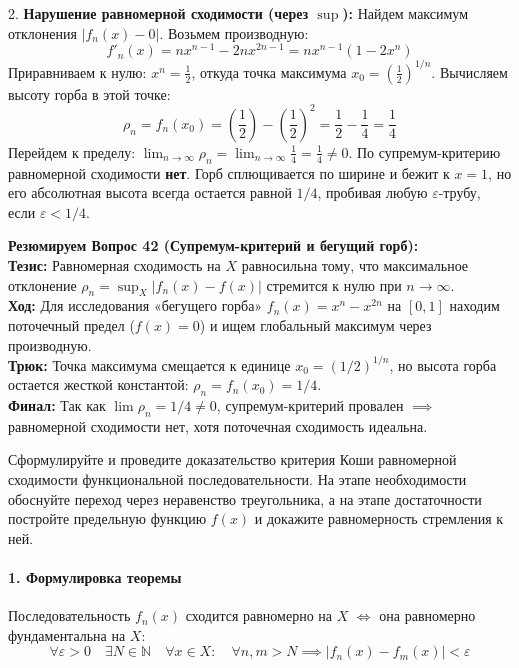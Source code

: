 2. \textbf{Нарушение равномерной сходимости (через $\sup$):}
Найдем максимум отклонения $|f_n(x) - 0|$. Возьмем производную:
$$ f'_n(x) = n x^{n-1} - 2n x^{2n-1} = n x^{n-1} (1 - 2x^n) $$
Приравниваем к нулю: $x^n = \frac{1}{2}$, откуда точка максимума $x_0 = \left(\frac{1}{2}\right)^{1/n}$.
Вычисляем высоту горба в этой точке:
$$ \rho_n = f_n(x_0) = \left(\frac{1}{2}\right) - \left(\frac{1}{2}\right)^2 = \frac{1}{2} - \frac{1}{4} = \frac{1}{4} $$
Перейдем к пределу: $\lim_{n \to \infty} \rho_n = \lim_{n \to \infty} \frac{1}{4} = \frac{1}{4} \ne 0$.
По супремум-критерию равномерной сходимости \textbf{нет}. Горб сплющивается по ширине и бежит к $x=1$, но его абсолютная высота всегда остается равной $1/4$, пробивая любую $\varepsilon$-трубу, если $\varepsilon < 1/4$.
\begin{tcolorbox}[colback=gray!5, colframe=black, boxrule=0.5pt, arc=0pt]
\textbf{Резюмируем Вопрос 42 (Супремум-критерий и бегущий горб):} \\
\textbf{Тезис:} Равномерная сходимость на $X$ равносильна тому, что максимальное отклонение $\rho_n = \sup_{X} |f_n(x) - f(x)|$ стремится к нулю при $n \to \infty$. \\
\textbf{Ход:} Для исследования «бегущего горба» $f_n(x) = x^n - x^{2n}$ на $[0,1]$ находим поточечный предел ($f(x)=0$) и ищем глобальный максимум через производную. \\
\textbf{Трюк:} Точка максимума смещается к единице $x_0 = (1/2)^{1/n}$, но высота горба остается жесткой константой: $\rho_n = f_n(x_0) = 1/4$. \\
\textbf{Финал:} Так как $\lim \rho_n = 1/4 \ne 0$, супремум-критерий провален $\implies$ равномерной сходимости нет, хотя поточечная сходимость идеальна.
\end{tcolorbox}



{Сформулируйте и проведите доказательство критерия Коши равномерной сходимости функциональной последовательности. На этапе необходимости обоснуйте переход через неравенство треугольника, а на этапе достаточности постройте предельную функцию $f(x)$ и докажите равномерность стремления к ней.}

\paragraph{1. Формулировка теоремы}
Последовательность $f_n(x)$ сходится равномерно на $X$ $\iff$ она равномерно фундаментальна на $X$:
$$ \forall \varepsilon > 0 \quad \exists N \in \mathbb{N} \quad \forall x \in X : \quad \forall n, m > N \implies |f_n(x) - f_m(x)| < \varepsilon $$

